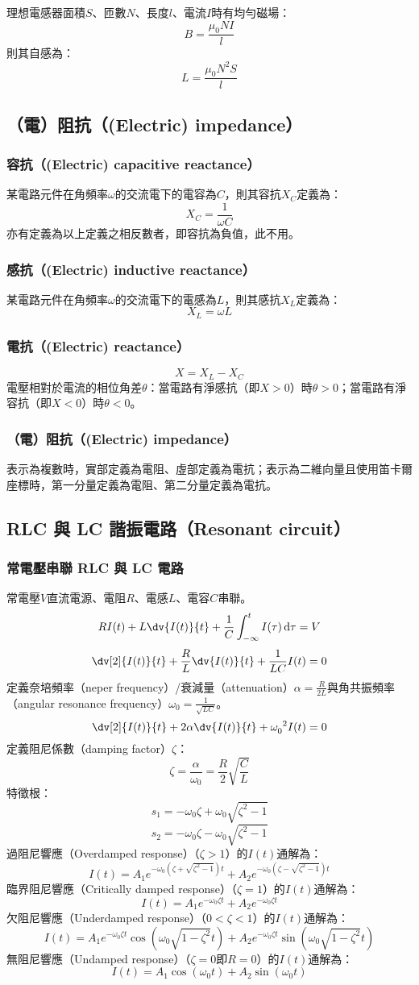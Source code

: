 \documentclass[a4paper,12pt]{report}
\begin{document}
\begin{itemize}
理想電感器面積$S$、匝數$N$、長度$l$、電流$I$時有均勻磁場：
\[B=\frac{\mu_0NI}{l}\]
則其自感為：
\[L=\frac{\mu_0N^2S}{l}\]
\subsection{（電）阻抗（(Electric) impedance）}
\subsubsection{容抗（(Electric) capacitive reactance）}
某電路元件在角頻率$\omega$的交流電下的電容為$C$，則其容抗$X_C$定義為：
\[X_C=\frac{1}{\omega C}\]
亦有定義為以上定義之相反數者，即容抗為負值，此不用。
\subsubsection{感抗（(Electric) inductive reactance）}
某電路元件在角頻率$\omega$的交流電下的電感為$L$，則其感抗$X_{L}$定義為：
\[X_{L}=\omega L\]
\subsubsection{電抗（(Electric) reactance）}
\[X=X_L-X_C\]
電壓相對於電流的相位角差$\theta$：當電路有淨感抗（即$X>0$）時$\theta>0$；當電路有淨容抗（即$X<0$）時$\theta<0$。
\subsubsection{（電）阻抗（(Electric) impedance）}
表示為複數時，實部定義為電阻、虛部定義為電抗；表示為二維向量且使用笛卡爾座標時，第一分量定義為電阻、第二分量定義為電抗。
\subsection{RLC 與 LC 諧振電路（Resonant circuit）}
\subsubsection{常電壓串聯 RLC 與 LC 電路}
常電壓$V$直流電源、電阻$R$、電感$L$、電容$C$串聯。
\[RI(t)+L\dv{I(t)}{t}+\frac{1}{C}\int _{-\infty}^tI(\tau)\,\mathrm{d}\tau=V\]
\[\dv[2]{I(t)}{t}+\frac{R}{L}\dv{I(t)}{t}+\frac{1}{LC}I(t)=0\]
定義奈培頻率（neper frequency）/衰減量（attenuation）$\alpha=\frac{R}{2L}$與角共振頻率（angular resonance frequency）$\omega_0=\frac{1}{\sqrt{LC}}$。
\[\dv[2]{I(t)}{t}+2\alpha\dv{I(t)}{t}+\omega_0^{\phantom{0}2}I(t)=0\]
定義阻尼係數（damping factor）$\zeta$：
\[\zeta=\frac{\alpha}{\omega_0}=\frac{R}{2}\sqrt{\frac{C}{L}}\]
特徵根：
\[s_1=-\omega_0\zeta+\omega_0\sqrt{\zeta^2-1}\]
\[s_2=-\omega_0\zeta-\omega_0\sqrt{\zeta^2-1}\]
過阻尼響應（Overdamped response）（$\zeta>1$）的$I(t)$通解為：
\[I(t)=A_1e^{-\omega_0\left(\zeta+\sqrt{\zeta^2-1}\right)t}+A_2e^{-\omega_0\left(\zeta-\sqrt{\zeta^2-1}\right)t}\]
臨界阻尼響應（Critically damped response）（$\zeta=1$）的$I(t)$通解為：
\[I(t)=A_1e^{-\omega_0\zeta t}+A_2e^{-\omega_0\zeta t}\]
欠阻尼響應（Underdamped response）（$0<\zeta<1$）的$I(t)$通解為：
\[I(t)=A_1e^{-\omega_0\zeta t}\cos\left(\omega_0\sqrt{1-\zeta^2}t\right)+A_2e^{-\omega_0\zeta t}\sin\left(\omega_0\sqrt{1-\zeta^2}t\right)\]
無阻尼響應（Undamped response）（$\zeta=0$即$R=0$）的$I(t)$通解為：
\[I(t)=A_1\cos\left(\omega_0t\right)+A_2\sin\left(\omega_0t\right)\]

\end{itemize}
\end{document}
